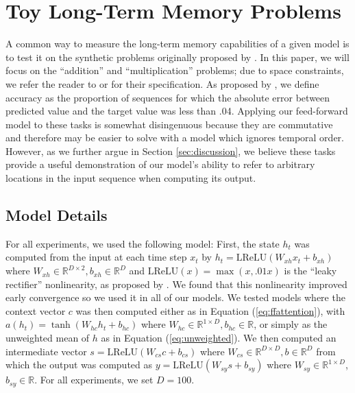 \documentclass{article} %
\begin{document}
\section{Toy Long-Term Memory Problems}
\label{sec:experiments}

A common way to measure the long-term memory capabilities of a given model is to test it on the synthetic problems originally proposed by \cite{hochreiter1997long}.
In this paper, we will focus on the ``addition'' and ``multiplication'' problems; due to space constraints, we refer the reader to \citep{hochreiter1997long} or \citep{sutskever2013importance} for their specification.
As proposed by \cite{hochreiter1997long}, we define accuracy as the proportion of sequences for which the absolute error between predicted value and the target value was less than .04.
Applying our feed-forward model to these tasks is somewhat disingenuous because they are commutative and therefore may be easier to solve with a model which ignores temporal order.
However, as we further argue in Section \ref{sec:discussion}, we believe these tasks provide a useful demonstration of our model's ability to refer to arbitrary locations in the input sequence when computing its output.

\subsection{Model Details}

For all experiments, we used the following model:
First, the state $h_t$ was computed from the input at each time step $x_t$ by $h_t = \textrm{LReLU}(W_{xh}x_t + b_{xh})$ where $W_{xh} \in \mathbb{R}^{D \times 2}, b_{xh} \in \mathbb{R}^D$ and $\textrm{LReLU}(x) = \max(x, .01x)$ is the ``leaky rectifier'' nonlinearity, as proposed by \cite{maas2013rectifier}.
We found that this nonlinearity improved early convergence so we used it in all of our models.
We tested models where the context vector $c$ was then computed either as in Equation (\ref{eq:ffattention}), with $a(h_t) =\tanh(W_{hc}h_t + b_{hc})$
where $W_{hc} \in \mathbb{R}^{1 \times D}, b_{hc} \in \mathbb{R}$, or simply as the unweighted mean of $h$ as in Equation (\ref{eq:unweighted}).
We then computed an intermediate vector $s = \textrm{LReLU}(W_{cs}c + b_{cs})$ where $W_{cs} \in \mathbb{R}^{D \times D}, b \in \mathbb{R}^D$ from which the output was computed as $y = \textrm{LReLU}(W_{sy}s + b_{sy})$ where $W_{sy} \in \mathbb{R}^{1 \times D}$, $b_{sy} \in \mathbb{R}$.
For all experiments, we set $D = 100$.
\end{document}
